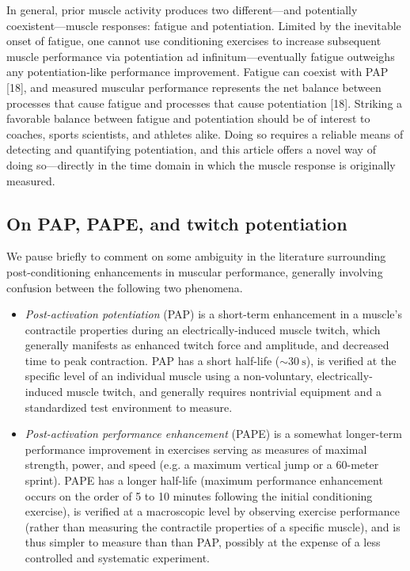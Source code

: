 \documentclass[utf8]{FrontiersinHarvard}
\begin{document}
In general, prior muscle activity produces two different---and potentially coexistent---muscle responses: fatigue and potentiation.
Limited by the inevitable onset of fatigue, one cannot use conditioning exercises to increase subsequent muscle performance via potentiation ad infinitum---eventually fatigue outweighs any potentiation-like performance improvement.
Fatigue can coexist with PAP [18], and measured muscular performance represents the net balance between processes that cause fatigue and processes that cause potentiation [18].
Striking a favorable balance between fatigue and potentiation should be of interest to coaches, sports scientists, and athletes alike.
Doing so requires a reliable means of detecting and quantifying potentiation, and this article offers a novel way of doing so---directly in the time domain in which the muscle response is originally measured.

\subsection{On PAP, PAPE, and twitch potentiation}
We pause briefly to comment on some ambiguity in the literature surrounding post-conditioning enhancements in muscular performance,
generally involving confusion between the following two phenomena.
\begin{itemize}

    \item \textit{Post-activation potentiation} (PAP) is a short-term enhancement in a muscle's contractile properties during an electrically-induced muscle twitch, which generally manifests as enhanced twitch force and amplitude, and decreased time to peak contraction.
    PAP has a short half-life ($ \sim \SI{30}{\second} $),
    is verified at the specific level of an individual muscle using a non-voluntary, electrically-induced muscle twitch, and generally requires nontrivial equipment and a standardized test environment to measure.

    \item \textit{Post-activation performance enhancement} (PAPE) is
    a somewhat longer-term performance improvement in exercises serving as measures of maximal strength, power, and speed (e.g. a maximum vertical jump or a 60-meter sprint).
    PAPE has a longer half-life (maximum performance enhancement occurs on the order of 5 to 10 minutes following the initial conditioning exercise),
    is verified at a macroscopic level by observing exercise performance (rather than measuring the contractile properties of a specific muscle),
    and is thus simpler to measure than than PAP, possibly at the expense of a less controlled and systematic experiment.

\end{itemize}
\end{document}
